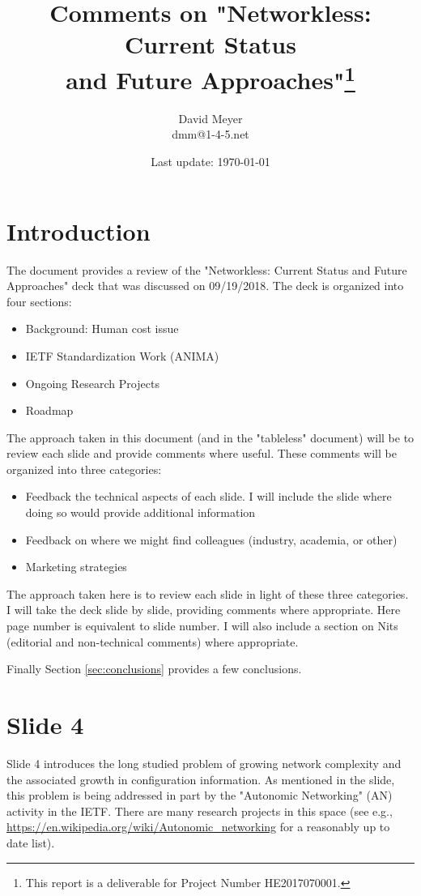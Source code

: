 \documentclass[11pt, oneside]{article}   	%
\title{Comments on "Networkless: Current Status \\ and Future Approaches"\footnote{This report is a deliverable for Project Number HE2017070001.}}
\author{David Meyer \\
dmm@1-4-5.net}
\date{Last update: \today}							%
\begin{document}
\maketitle

\section{Introduction} 
\label{sec:intro}
The document provides a review of the "Networkless: Current Status and Future Approaches" deck that was discussed on 09/19/2018. The deck is organized into four sections:
\begin{itemize}
\item Background: Human cost issue
\item IETF Standardization Work (ANIMA)
\item Ongoing Research Projects
\item Roadmap
\end{itemize}

\bigskip
\noindent
The approach taken in this document (and in the "tableless" document) will be to review each slide and provide comments where useful. 
These comments will be organized into three categories: 

\begin{itemize}
\item Feedback the technical aspects of each slide. I will include the slide where doing so would provide additional information
\item Feedback  on where we might find colleagues (industry, academia, or other)
\item Marketing strategies
\end{itemize}

\bigskip
\noindent
The approach taken here is to review each slide in light of these three categories. I will take the deck slide by slide, providing comments where appropriate. Here page number is equivalent 
to slide number. I will also include a section on Nits (editorial and non-technical comments) where appropriate.

\bigskip
\noindent
Finally Section \ref{sec:conclusions} provides a few conclusions.

\section{Slide 4}
\label{sec:slide4}

Slide 4 introduces the long studied problem of growing network complexity and the associated growth in configuration information. As mentioned in the slide, this problem is being
addressed in part by the "Autonomic Networking" (AN) activity in the IETF. There are many research projects in this space (see e.g., \url{https://en.wikipedia.org/wiki/Autonomic_networking}
for a reasonably up to date list).
\end{document}
